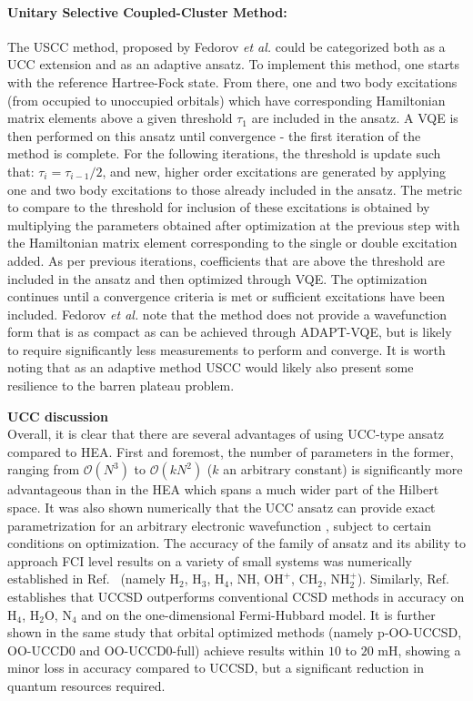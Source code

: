 \paragraph{Unitary Selective Coupled-Cluster Method:} The USCC method, proposed by Fedorov \textit{et al.} \cite{Fedorov2022} could be categorized both as a UCC extension and as an adaptive ansatz. To implement this method, one starts with the reference Hartree-Fock state. From there, one and two body excitations (from occupied to unoccupied orbitals) which have corresponding Hamiltonian matrix elements above a given threshold $\tau_1$ are included in the ansatz. A VQE is then performed on this ansatz until convergence - the first iteration of the method is complete. For the following iterations, the threshold is update such that: $\tau_i = \tau_{i-1} / 2$, and new, higher order excitations are generated by applying one and two body excitations to those already included in the ansatz. The metric to compare to the threshold for inclusion of these excitations is obtained by multiplying the parameters obtained after optimization at the previous step with the Hamiltonian matrix element corresponding to the single or double excitation added. As per previous iterations, coefficients that are above the threshold are included in the ansatz and then optimized through VQE.
The optimization continues until a convergence criteria is met or sufficient excitations have been included. Fedorov \textit{et al.} \cite{Fedorov2022} note that the method does not provide a wavefunction form that is as compact as can be achieved through ADAPT-VQE, but is likely to require significantly less measurements to perform and converge. It is worth noting that as an adaptive method USCC would likely also present some resilience to the barren plateau problem. 

\textbf{UCC discussion}\\

Overall, it is clear that there are several advantages of using UCC-type ansatz compared to HEA. First and foremost, the number of parameters in the former, ranging from $\mathcal{O}(N^3)$ to $\mathcal{O}(kN^2)$ ($k$ an arbitrary constant) is significantly more advantageous than in the HEA which spans a much wider part of the Hilbert space. It was also shown numerically that the UCC ansatz can provide exact parametrization for an arbitrary electronic wavefunction \cite{Evangelista2019}, subject to certain conditions on optimization. The accuracy of the family of ansatz and its ability to approach FCI level results on a variety of small systems was numerically established in Ref.~\cite{GreeneDiniz2020} (namely $\mathrm{H_2}$, $\mathrm{H_3}$, $\mathrm{H_4}$, $\mathrm{NH}$, $\mathrm{OH^{+}}$, $\mathrm{CH_2}$, $\mathrm{NH_2^+}$). Similarly, Ref.~\cite{Sokolov2020} establishes that UCCSD outperforms conventional CCSD methods in accuracy on $\mathrm{H_4}$, $\mathrm{H_2O}$, $\mathrm{N_4}$ and on the one-dimensional Fermi-Hubbard model. It is further shown in the same study that orbital optimized methods (namely p-OO-UCCSD, OO-UCCD0 and OO-UCCD0-full) achieve results within $10$ to $20$ mH, showing a minor loss in accuracy compared to UCCSD, but a significant reduction in quantum resources required.

